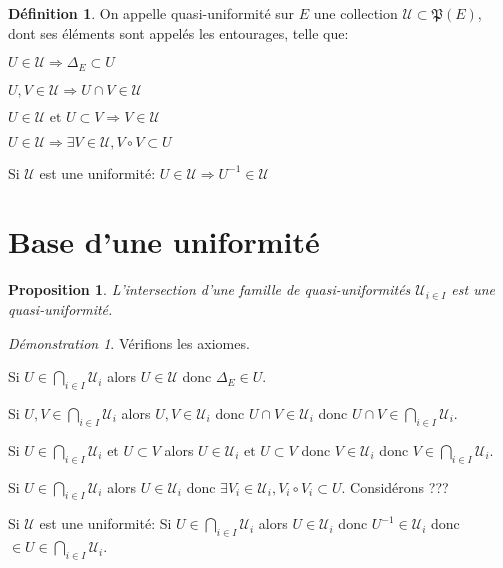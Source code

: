 \documentclass[a4paper, 11pt, french]{book}
\newenvironment{itemise}{\itemize}{\enditemize}
\theoremstyle{plain} %
\newtheorem{proposition}{Proposition}
\theoremstyle{definition} %
\newtheorem{definition}{Définition}
\theoremstyle{remark} %
\newtheorem*{demonstration}{Démonstration}
\newcommand{\1}{\mathds{1}}
\newcommand{\inv}[1]{#1^{-1}}
\newcommand\et{\text{ et }}
\renewcommand{\frak}[1]{\mathfrak{#1}}
\newcommand{\scr}[1]{\mathscr{#1}}
\begin{document}
\begin{definition}
	On appelle quasi-uniformité sur $E$ une collection $\scr{U}\subset\frak{P}(E)$, dont ses éléments sont appelés les entourages, telle que:
	\begin{itemise}
		\item $U\in\scr{U}\Rightarrow\Delta_E\subset U$
		\item $U, V\in\scr{U}\Rightarrow U\cap V\in\scr{U}$
		\item $U\in\scr{U}\et U\subset V\Rightarrow V\in\scr{U}$
		\item $U\in\scr{U}\Rightarrow\exists V\in\scr{U}, V\circ V\subset U$
		\item Si $\scr{U}$ est une uniformité: $U\in\scr{U}\Rightarrow\inv{U}\in\scr{U}$
	\end{itemise}
\end{definition}

\section{Base d'une uniformité}

\begin{proposition}
	L'intersection d'une famille de quasi-uniformités $\scr{U}_{i\in I}$ est une quasi-uniformité.
\end{proposition}

\begin{demonstration}
	Vérifions les axiomes.
	\begin{itemise}
		\item Si $U\in\bigcap_{i\in I}\scr{U}_i$ alors $U\in\scr{U}$ donc $\Delta_E\in U$.
		\item Si $U, V\in\bigcap_{i\in I}\scr{U}_i$ alors $U, V\in\scr{U}_i$ donc $U\cap V\in\scr{U}_i$ donc $U\cap V\in\bigcap_{i\in I}\scr{U}_i$.
		\item Si $U\in\bigcap_{i\in I}\scr{U}_i\et U\subset V$ alors $U\in\scr{U}_i\et U\subset V$ donc $V\in\scr{U}_i$ donc $V\in\bigcap_{i\in I}\scr{U}_i$.
		\item Si $U\in\bigcap_{i\in I}\scr{U}_i$ alors $U\in\scr{U}_i$ donc $\exists V_i\in\scr{U}_i, V_i\circ V_i\subset U$.
		Considérons {\color{red} ???}
		\item Si $\scr{U}$ est une uniformité: Si $U\in\bigcap_{i\in I}\scr{U}_i$ alors $U\in\scr{U}_i$ donc $\inv{U}\in\scr{U}_i$ donc $\in{U}\in\bigcap_{i\in I}\scr{U}_i$.
	\end{itemise}
\end{demonstration}
\end{document}
